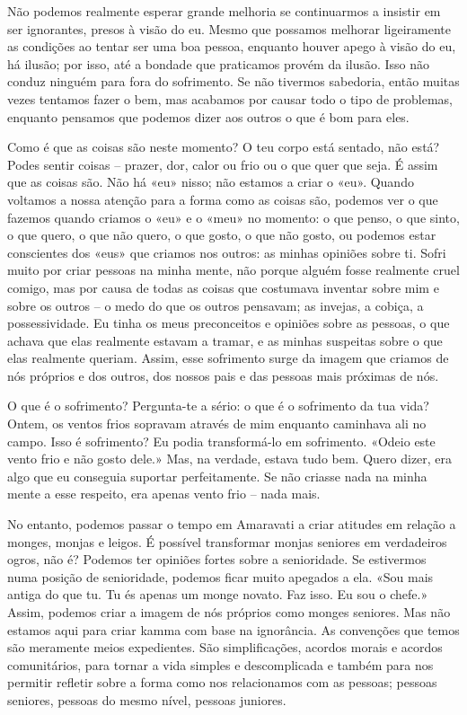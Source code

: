 Não podemos realmente esperar grande melhoria se continuarmos a insistir em ser
ignorantes, presos à visão do eu. Mesmo que possamos melhorar ligeiramente as
condições ao tentar ser uma boa pessoa, enquanto houver apego à visão do eu, há
ilusão; por isso, até a bondade que praticamos provém da ilusão. Isso não conduz
ninguém para fora do sofrimento. Se não tivermos sabedoria, então muitas vezes
tentamos fazer o bem, mas acabamos por causar todo o tipo de problemas, enquanto
pensamos que podemos dizer aos outros o que é bom para eles.

Como é que as coisas são neste momento? O teu corpo está sentado, não está?
Podes sentir coisas -- prazer, dor, calor ou frio ou o que quer que seja. É
assim que as coisas são. Não há «eu» nisso; não estamos a criar o «eu». Quando
voltamos a nossa atenção para a forma como as coisas são, podemos ver o que
fazemos quando criamos o «eu» e o «meu» no momento: o que penso, o que sinto, o
que quero, o que não quero, o que gosto, o que não gosto, ou podemos estar
conscientes dos «eus» que criamos nos outros: as minhas opiniões sobre ti. Sofri
muito por criar pessoas na minha mente, não porque alguém fosse realmente cruel
comigo, mas por causa de todas as coisas que costumava inventar sobre mim e
sobre os outros -- o medo do que os outros pensavam; as invejas, a cobiça, a
possessividade. Eu tinha os meus preconceitos e opiniões sobre as pessoas, o que
achava que elas realmente estavam a tramar, e as minhas suspeitas sobre o que
elas realmente queriam. Assim, esse sofrimento surge da imagem que criamos de
nós próprios e dos outros, dos nossos pais e das pessoas mais próximas de nós.

O que é o sofrimento? Pergunta-te a sério: o que é o sofrimento da tua vida?
Ontem, os ventos frios sopravam através de mim enquanto caminhava ali no campo.
Isso é sofrimento? Eu podia transformá-lo em sofrimento. «Odeio este vento frio
e não gosto dele.» Mas, na verdade, estava tudo bem. Quero dizer, era algo que
eu conseguia suportar perfeitamente. Se não criasse nada na minha mente a esse
respeito, era apenas vento frio -- nada mais.

No entanto, podemos passar o tempo em Amaravati a criar atitudes em relação a
monges, monjas e leigos. É possível transformar monjas seniores em verdadeiros
ogros, não é? Podemos ter opiniões fortes sobre a senioridade. Se estivermos
numa posição de senioridade, podemos ficar muito apegados a ela. «Sou mais
antiga do que tu. Tu és apenas um monge novato. Faz isso. Eu sou o chefe.»
Assim, podemos criar a imagem de nós próprios como monges seniores. Mas não
estamos aqui para criar kamma com base na ignorância. As convenções que temos
são meramente meios expedientes. São simplificações, acordos morais e acordos
comunitários, para tornar a vida simples e descomplicada e também para nos
permitir refletir sobre a forma como nos relacionamos com as pessoas; pessoas
seniores, pessoas do mesmo nível, pessoas juniores.

